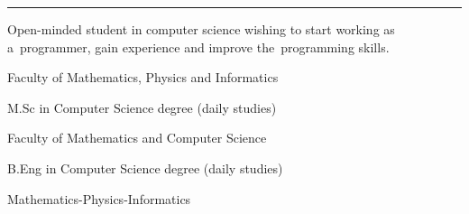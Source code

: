 \documentclass[11pt,a4paper]{article}
\begin{document}
    \noindent\rule{\textwidth}{0.4pt}
  
  
    \vspace{0.4cm}
  
    \smallskip
    \noindent
    Open-minded student in computer science wishing to start working as a~programmer,\linebreak
    gain experience and improve the~programming skills.
  
  
    \vspace{0.5cm}
  
    \medskip
    \vspace{-1.6mm}
    \begin{description} \itemsep0pt \parskip0pt 
        \item[ ] Faculty of Mathematics, Physics and Informatics
        \item[ ] M.Sc in Computer Science degree (daily studies)
    \end{description}
  
    \vspace{-1.6mm}
    \begin{description} \itemsep0pt \parskip0pt 
        \item[ ] Faculty of Mathematics and Computer Science
        \item[ ] B.Eng in Computer Science degree (daily studies)
    \end{description}
  
    \vspace{-1.6mm}
    \begin{description} \itemsep0pt \parskip0pt 
        \item[ ] Mathematics-Physics-Informatics
    \end{description}
  
  
\end{document}
